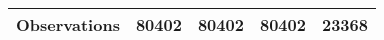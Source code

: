 {\begin{tabular}{l*{4}{c}}
 \\
\hline
Observations        &       80402         &       80402         &       80402         &       23368         \\
\hline\hline
\end{tabular}
}
